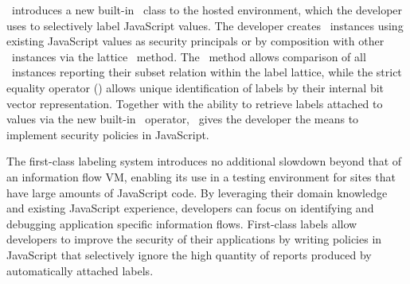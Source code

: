 \FlowCore\ introduces a new built-in \FlowLabelObject\ class to the hosted environment, which the developer uses to selectively label JavaScript values.
The developer creates \FlowLabelObject\ instances using existing JavaScript values as security principals or by composition with other \FlowLabelObject\ instances via the lattice \join\ method.
The \msubsumes\ method allows comparison of all \FlowLabelObject\ instances reporting their subset relation within the label lattice, while the strict equality operator (\code{===}) allows unique identification of labels by their internal bit vector representation.
Together with the ability to retrieve labels attached to values via the new built-in \mlabelof\ operator, \FlowCore\ gives the developer the means to implement security policies in JavaScript.

The first-class labeling system introduces no additional slowdown beyond that of an information flow VM, enabling its use in a testing environment for sites that have large amounts of JavaScript code.
By leveraging their domain knowledge and existing JavaScript experience, developers can focus on identifying and debugging application specific information flows.
First-class labels allow developers to improve the security of their applications by writing policies in JavaScript that selectively ignore the high quantity of reports produced by automatically attached labels.

